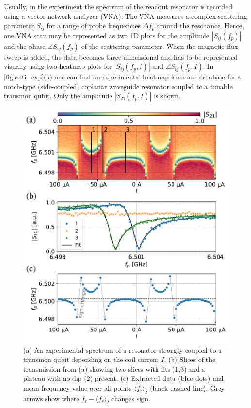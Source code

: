 \documentclass[%
 aip,
 draft,
 amsmath,amssymb,
 reprint,%
]{revtex4-1}
\begin{document}
Usually, in the experiment the spectrum of the readout resonator is recorded using a vector network analyzer (VNA).  The VNA measures a complex scattering parameter $S_{ij}$  for a range of probe frequencies $\Delta f_p$ around the resonance. Hence, one VNA scan may be represented as two 1D plots for the amplitude $|S_{ij}(f_p)|$ and the phase $\angle S_{ij}(f_p)$ of the scattering parameter. When the magnetic flux sweep is added, the data becomes three-dimensional and has to be represented visually using two heatmap plots for $|S_{ij}(f_p, I)|$ and $\angle S_{ij}(f_p, I)$. In \autoref{fig:anti_exp}(a) one can find an experimental heatmap from our database for a notch-type (side-coupled) coplanar waveguide resonator coupled to a tunable transmon qubit. Only the amplitude $|S_{21}(f_p, I)|$ is shown.
\begin{figure}[h!]
\includegraphics[width=\linewidth]{anti_subplots}
\caption{(a) An experimental spectrum of a resonator strongly coupled to a transmon qubit depending on the coil current $I$. (b) Slices of the transmission from (a) showing two slices with fits (1,3) and a plateau with no dip (2) present. (c) Extracted data (blue dots) and mean frequency value over all points $\langle f_r \rangle_{I}$ (black dashed line). Grey arrows show where $f_r - \langle f_r \rangle_{I}$ changes sign.}
\label{fig:anti_exp}
\end{figure}
\end{document}

